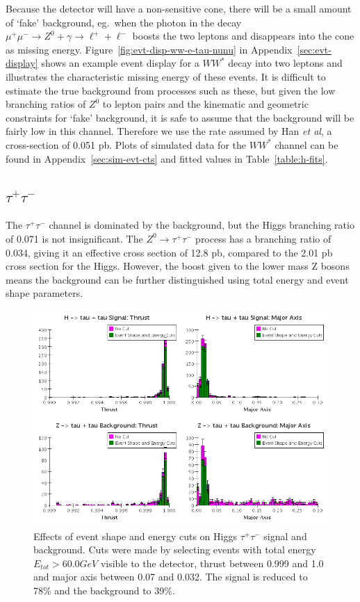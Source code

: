 \documentclass[a4paper]{article}
\begin{document}
Because the detector will have a non-sensitive cone, there will be a small amount of `fake' background, eg.~when the photon in the decay $\mu^+\mu^-\rightarrow Z^0+\gamma\rightarrow\ell^++\ell^-$ boosts the two leptons and disappears into the cone as missing energy. Figure~\ref{fig:evt-disp-ww-e-tau-nunu} in Appendix~\ref{sec:evt-display} shows an example event display for a $WW^*$ decay into two leptons and illustrates the characteristic missing energy of these events. It is difficult to estimate the true background from processes such as these, but given the low branching ratios of $Z^0$ to lepton pairs and the kinematic and geometric constraints for `fake' background, it is safe to assume that the background will be fairly low in this channel. Therefore we use the rate assumed by Han \emph{et al}\cite{han-higgs-measurement}, a cross-section of 0.051 pb. Plots of simulated data for the $WW^*$ channel can be found in Appendix~\ref{sec:sim-evt-cts} and fitted values in Table~\ref{table:h-fits}.

\subsection{$\tau^+\tau^-$}
The $\tau^+\tau^-$ channel is dominated by the background, but the Higgs branching ratio of 0.071 is not insignificant. The $Z^0\rightarrow \tau^+\tau^-$ process has a branching ratio of 0.034, giving it an effective cross section of 12.8 pb, compared to the 2.01 pb cross section for the Higgs. However, the boost given to the lower mass Z bosons means the background can be further distinguished using total energy and event shape parameters. 

\begin{figure}
	\includegraphics[width=\textwidth]{tautau-en-thrust-cuts}
	\caption{Effects of event shape and energy cuts on Higgs $\tau^+\tau^-$ signal and background. Cuts were made by selecting events with total energy $E_{tot} > 60.0GeV$ visible to the detector, thrust between 0.999 and 1.0 and major axis between 0.07 and 0.032. The signal is reduced to 78\% and the background to 39\%.}
\label{tautau-en-thrust-cuts}
\end{figure}
\end{document}
